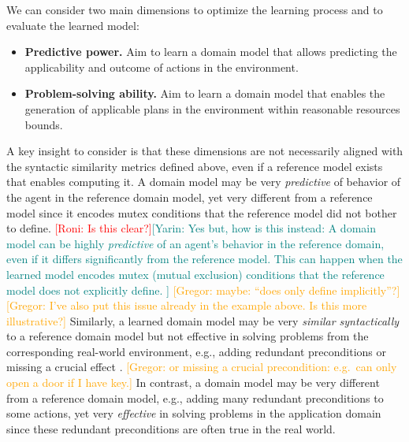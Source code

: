 \documentclass{article}
\theoremstyle{definition}
\theoremstyle{remark}
\newcommand{\roni}[1]{{\textcolor{red}{[Roni: #1]}}}
\newcommand{\mauro}[1]{{\textcolor{green}{[Mauro: #1]}}}
\newcommand{\yarin}[1]{{\textcolor{teal}{[Yarin: #1]}}}
\newcommand{\gregor}[1]{{\textcolor{orange}{[Gregor: #1]}}}
\begin{document}
We can consider two main dimensions to optimize the learning process and to evaluate the learned model:
%
\begin{itemize}
    \item \textbf{Predictive power.} Aim to learn a domain model that allows predicting the applicability and outcome of actions in the environment. 
    \item \textbf{Problem-solving ability.} Aim to learn a domain model that enables the generation of applicable plans in the environment within reasonable resources bounds. %
\end{itemize}


A key insight to consider 
is that these dimensions are not necessarily aligned with the syntactic similarity metrics defined above, even if a reference model exists that enables computing it.  
A domain model may be very \emph{predictive} of 
behavior of the agent in the reference domain model, yet very different from a reference model since it encodes mutex conditions that the reference model did not bother to define. \roni{Is this clear?}\yarin{Yes but, how is this instead: A domain model can be highly \emph{predictive} of an agent's behavior in the reference domain, even if it differs significantly from the reference model. This can happen when the learned model encodes mutex (mutual exclusion) conditions that the reference model does not explicitly define.
}
\gregor{maybe: ``does only define implicitly''?} \gregor{I've also put this issue already in the example above. Is this more illustrative?}
Similarly, a learned domain model may be very \emph{similar syntactically} to a reference domain model but not effective in solving problems from the corresponding real-world environment, 
e.g., adding redundant preconditions or missing a crucial effect \citep{DBLP:conf/kcap/VallatiC19}. \gregor{or missing a crucial precondition: e.g.\ can only open a door if I have key.}
In contrast, a domain model may be very different from a reference domain model, e.g., adding many redundant preconditions to some actions, yet very \emph{effective} in solving problems in the application domain since these redundant preconditions are often true in the real world. 
\end{document}

